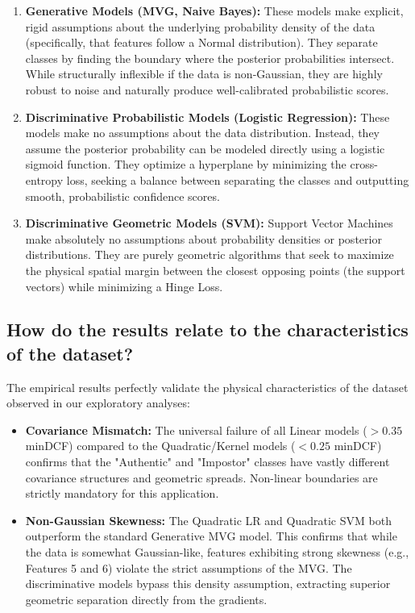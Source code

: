 \begin{enumerate}
    \item \textbf{Generative Models (MVG, Naive Bayes):} These models make explicit, rigid assumptions about the underlying probability density of the data (specifically, that features follow a Normal distribution). They separate classes by finding the boundary where the posterior probabilities intersect. While structurally inflexible if the data is non-Gaussian, they are highly robust to noise and naturally produce well-calibrated probabilistic scores.
    \item \textbf{Discriminative Probabilistic Models (Logistic Regression):} These models make no assumptions about the data distribution. Instead, they assume the posterior probability can be modeled directly using a logistic sigmoid function. They optimize a hyperplane by minimizing the cross-entropy loss, seeking a balance between separating the classes and outputting smooth, probabilistic confidence scores.
    \item \textbf{Discriminative Geometric Models (SVM):} Support Vector Machines make absolutely no assumptions about probability densities or posterior distributions. They are purely geometric algorithms that seek to maximize the physical spatial margin between the closest opposing points (the support vectors) while minimizing a Hinge Loss. 
\end{enumerate}

\subsection*{How do the results relate to the characteristics of the dataset?}

The empirical results perfectly validate the physical characteristics of the dataset observed in our exploratory analyses:
\begin{itemize}
    \item \textbf{Covariance Mismatch:} The universal failure of all Linear models ($> 0.35$ minDCF) compared to the Quadratic/Kernel models ($< 0.25$ minDCF) confirms that the "Authentic" and "Impostor" classes have vastly different covariance structures and geometric spreads. Non-linear boundaries are strictly mandatory for this application.
    \item \textbf{Non-Gaussian Skewness:} The Quadratic LR and Quadratic SVM both outperform the standard Generative MVG model. This confirms that while the data is somewhat Gaussian-like, features exhibiting strong skewness (e.g., Features 5 and 6) violate the strict assumptions of the MVG. The discriminative models bypass this density assumption, extracting superior geometric separation directly from the gradients.
\end{itemize}

